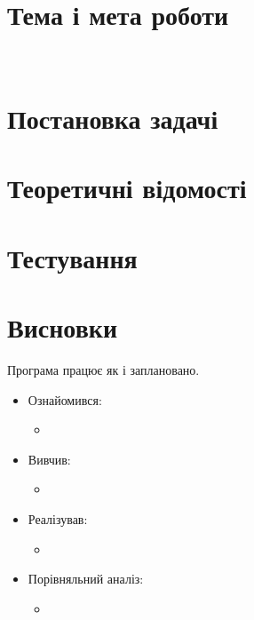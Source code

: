 \nocite{*}
\sffamily

\section{Тема і мета роботи}
 \\


\section{Постановка задачі}

\section{Теоретичні відомості}

\section{Тестування}

\section{Висновки}
Програма працює як і заплановано.
\begin{itemize}
	\item Ознайомився:
		\begin{itemize}
			\item
		\end{itemize}
	\item Вивчив:
		\begin{itemize}
			\item
		\end{itemize}
	\item Реалізував:
		\begin{itemize}
			\item
		\end{itemize}
	\item Порівняльний аналіз:
		\begin{itemize}
			\item
		\end{itemize}
\end{itemize}